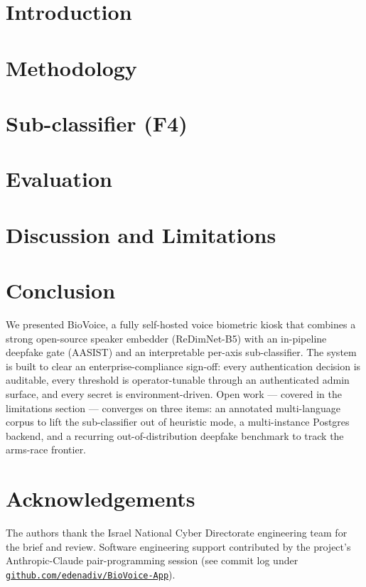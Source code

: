 \documentclass[conference]{IEEEtran}
\begin{document}
\section{Introduction}
\label{sec:intro}

\section{Methodology}
\label{sec:methodology}

\section{Sub-classifier (F4)}
\label{sec:subclassifier}

\section{Evaluation}
\label{sec:evaluation}

\section{Discussion and Limitations}
\label{sec:discussion}

\section{Conclusion}
\label{sec:conclusion}
We presented BioVoice, a fully self-hosted voice biometric kiosk that
combines a strong open-source speaker embedder (ReDimNet-B5) with an
in-pipeline deepfake gate (AASIST) and an interpretable per-axis
sub-classifier. The system is built to clear an enterprise-compliance
sign-off: every authentication decision is auditable, every threshold
is operator-tunable through an authenticated admin surface, and every
secret is environment-driven. Open work — covered in the
limitations section — converges on three items: an annotated
multi-language corpus to lift the sub-classifier out of heuristic
mode, a multi-instance Postgres backend, and a recurring out-of-distribution
deepfake benchmark to track the arms-race frontier.

\section*{Acknowledgements}
The authors thank the Israel National Cyber Directorate engineering
team for the brief and review. Software engineering support
contributed by the project's Anthropic-Claude pair-programming session
(see commit log under
\href{https://github.com/edenadiv/BioVoice-App}
     {\texttt{github.com/edenadiv/BioVoice-App}}).



\end{document}
